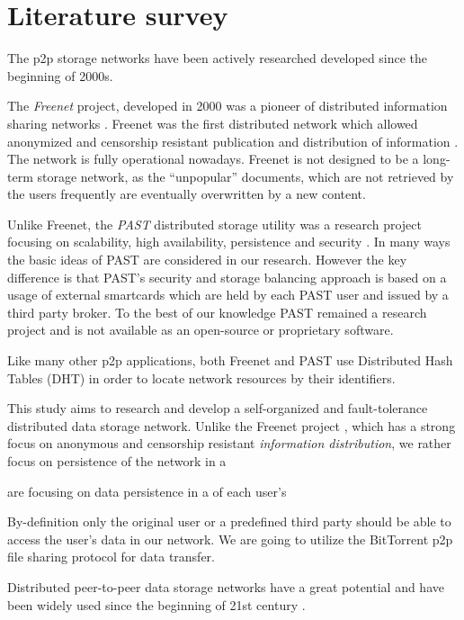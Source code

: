 \section{Literature survey}

The p2p storage networks have been actively researched developed since
the beginning of 2000s.

The \emph{Freenet} project, developed in 2000 was
a pioneer of distributed information sharing networks \cite{freenet}.
Freenet was the first distributed network which allowed anonymized
and censorship resistant publication and distribution of information
\cite{dark-freenet}. The network is fully operational nowadays.
Freenet is not designed to be a long-term storage network, as
the ``unpopular'' documents, which are not retrieved by the
users frequently are eventually overwritten by a new content.

Unlike Freenet, the \emph{PAST} distributed storage utility was a
research project focusing on scalability, high availability, persistence
and security \cite{past}. In many ways the basic ideas of PAST are
considered in our research. However the key difference is that PAST's
security and storage balancing approach is based on a usage of external
smartcards which are held by each PAST user and issued by a third
party broker. To the best of our knowledge PAST remained a research
project and is not available as an open-source or proprietary software.

Like many other p2p applications, both Freenet and PAST use Distributed Hash Tables (DHT) in order to locate network resources by their identifiers.

This study aims to research and develop a self-organized and fault-tolerance
distributed data storage network. Unlike the Freenet project \cite{freenet},
which has a strong focus on anonymous and censorship resistant \emph{information
distribution}, we rather focus on persistence of the network in a

  are focusing on data persistence in a  of each user's

By-definition only the original user
or a predefined third party should be able to access the user's data
in our network. We are going to utilize the BitTorrent \cite{bittorrent-ma}
p2p file sharing protocol for data transfer.


Distributed peer-to-peer data storage networks have a great potential and have
been widely used since the beginning of 21st century
\cite{chord-01}.
